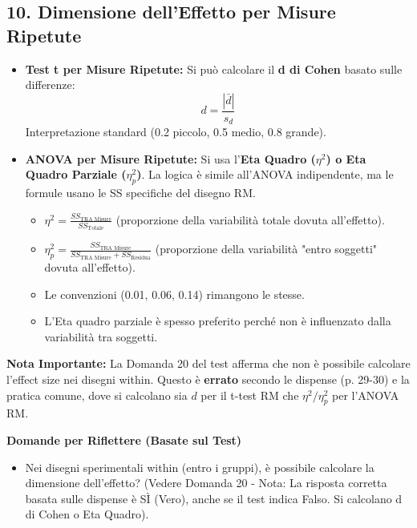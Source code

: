 \documentclass[12pt, a4paper]{article}
\newenvironment{reflectionbox}{%
    \medskip
    \begin{framed}\par\noindent
    \textbf{\color{boxtitlecolor}Domande per Riflettere (Basate sul Test)} \par
    \begin{itemize}[leftmargin=*, label=$\blacktriangleright$]
}{%
    \end{itemize}\par
    \end{framed}
    \medskip
}
\newcommand{\etasq}{\eta^2} %
\newcommand{\etasqpart}{\eta_p^2} %
\begin{document}
\subsection*{10. Dimensione dell'Effetto per Misure Ripetute}
\begin{itemize}
    \item \textbf{Test t per Misure Ripetute:} Si può calcolare il \textbf{d di Cohen} basato sulle differenze:
      $$ d = \frac{|\bar{d}|}{s_d} $$
      Interpretazione standard (0.2 piccolo, 0.5 medio, 0.8 grande).
    \item \textbf{ANOVA per Misure Ripetute:} Si usa l'\textbf{Eta Quadro ($\etasq$) o Eta Quadro Parziale ($\etasqpart$)}. La logica è simile all'ANOVA indipendente, ma le formule usano le SS specifiche del disegno RM.
        \begin{itemize}
            \item $\etasq = \frac{SS_{\text{TRA Misure}}}{SS_{\text{Totale}}}$ (proporzione della variabilità totale dovuta all'effetto).
            \item $\etasqpart = \frac{SS_{\text{TRA Misure}}}{SS_{\text{TRA Misure}} + SS_{\text{Residua}}}$ (proporzione della variabilità "entro soggetti" dovuta all'effetto).
            \item Le convenzioni (0.01, 0.06, 0.14) rimangono le stesse.
            \item L'Eta quadro parziale è spesso preferito perché non è influenzato dalla variabilità tra soggetti.
        \end{itemize}
\end{itemize}
\textbf{Nota Importante:} La Domanda 20 del test afferma che non è possibile calcolare l'effect size nei disegni within. Questo è \textbf{errato} secondo le dispense (p. 29-30) e la pratica comune, dove si calcolano sia $d$ per il t-test RM che $\etasq / \etasqpart$ per l'ANOVA RM.

\begin{reflectionbox}
    \item Nei disegni sperimentali within (entro i gruppi), è possibile calcolare la dimensione dell'effetto? (Vedere Domanda 20 - Nota: La risposta corretta basata sulle dispense è SÌ (Vero), anche se il test indica Falso. Si calcolano d di Cohen o Eta Quadro).
\end{reflectionbox}
\end{document}
